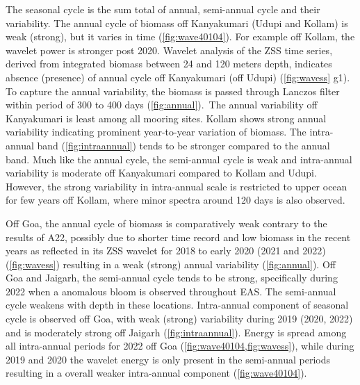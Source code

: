 \documentclass[authoryear,review,12pt]{elsarticle}
\begin{document}
	The seasonal cycle is the sum total of annual, semi-annual cycle and their variability. The annual cycle of biomass off Kanyakumari (Udupi and Kollam) is weak (strong), but it varies in time (\cref{fig:wave40104}). For example off Kollam, the wavelet power is stronger post 2020. Wavelet analysis of the ZSS time series, derived from integrated biomass between 24 and 120 meters depth, indicates absence (presence) of annual cycle off Kanyakumari (off Udupi) (\cref{fig:wavess} g1). To capture the annual variability, the biomass is passed through Lanczos filter within period of 300 to 400 days (\cref{fig:annual}).~The annual variability off Kanyakumari is least among all mooring sites. Kollam shows strong annual variability indicating prominent year-to-year variation of biomass. The intra-annual band (\cref{fig:intraannual}) tends to be stronger compared to the annual band. Much like the annual cycle, the semi-annual cycle is weak and intra-annual variability is moderate off Kanyakumari compared to Kollam and Udupi. However, the strong variability in intra-annual scale is restricted to upper ocean for few years off Kollam, where minor spectra around 120 days is also observed.
	
	Off Goa, the annual cycle of biomass is comparatively weak contrary to the results of A22, possibly due to shorter time record and low biomass in the recent years as reflected in its ZSS wavelet for 2018 to early 2020 (2021 and 2022) (\cref{fig:wavess}) resulting in a weak (strong) annual variability (\cref{fig:annual}). Off Goa and Jaigarh, the semi-annual cycle tends to be strong, specifically during 2022 when a anomalous bloom is observed throughout EAS. The semi-annual cycle weakens with depth in these locations. Intra-annual component of seasonal cycle is observed off Goa, with weak (strong) variability during  2019 (2020, 2022) and is moderately strong off Jaigarh (\cref{fig:intraannual}). Energy is spread among all intra-annual periods for 2022 off Goa (\cref{fig:wave40104,fig:wavess}), while during 2019 and 2020 the wavelet energy is only present in the semi-annual periods resulting in a overall weaker intra-annual component (\cref{fig:wave40104}).
 
\end{document}
